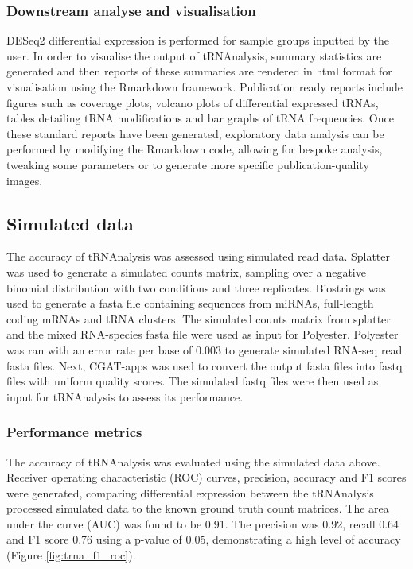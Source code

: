 \subsubsection{Downstream analyse and visualisation}
DESeq2 differential expression is performed for sample groups inputted by the user.
In order to visualise the output of tRNAnalysis, summary statistics are generated and then reports of these summaries are rendered in html format for visualisation using the Rmarkdown framework.
Publication ready reports include figures such as coverage plots, volcano plots of differential expressed tRNAs, tables detailing tRNA modifications and bar graphs of tRNA frequencies.
Once these standard reports have been generated, exploratory data analysis can be performed by modifying the Rmarkdown code, allowing for bespoke analysis, tweaking some parameters or to generate more specific publication-quality images.

\subsection{Simulated data}
The accuracy of tRNAnalysis was assessed using simulated read data.
Splatter\cite{zappia2017splatter} was used to generate a simulated counts matrix, sampling over a negative binomial distribution with two conditions and three replicates.
Biostrings\cite{pages2013package} was used to generate a fasta file containing sequences from miRNAs, full-length coding mRNAs and tRNA clusters.
The simulated counts matrix from splatter and the mixed RNA-species fasta file were used as input for Polyester\cite{frazee2015polyester}.
Polyester was ran with an error rate per base of 0.003 to generate simulated RNA-seq read fasta files.
Next, CGAT-apps\cite{sims2014cgat} was used to convert the output fasta files into fastq files with uniform quality scores.
The simulated fastq files were then used as input for tRNAnalysis to assess its performance.

\subsubsection{Performance metrics}
The accuracy of tRNAnalysis was evaluated using the simulated data above.
Receiver operating characteristic (ROC) curves, precision, accuracy and F1 scores were generated, comparing differential expression between the tRNAnalysis processed simulated data to the known ground truth count matrices.
The area under the curve (AUC) was found to be 0.91.
The precision was 0.92, recall 0.64 and F1 score 0.76 using a p-value of 0.05, demonstrating a high level of accuracy (Figure \ref{fig:trna_f1_roc}).

